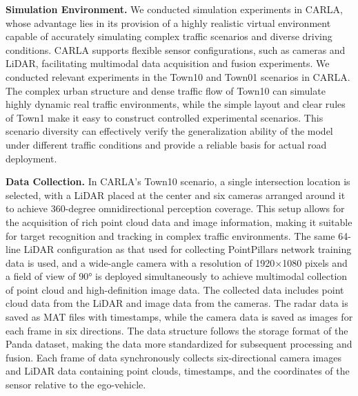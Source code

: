 \documentclass[lettersize,journal]{IEEEtran}
\begin{document}
\textbf{Simulation Environment.}
We conducted simulation experiments in CARLA, whose advantage lies in its provision of a highly realistic virtual environment capable of accurately simulating complex traffic scenarios and diverse driving conditions. 
CARLA supports flexible sensor configurations, such as cameras and LiDAR, facilitating multimodal data acquisition and fusion experiments\cite{Alpher22e}. 
We conducted relevant experiments in the Town10 and Town01 scenarios in CARLA.
The complex urban structure and dense traffic flow of Town10 can simulate highly dynamic real traffic environments, while the simple layout and clear rules of Town1 make it easy to construct controlled experimental scenarios.
This scenario diversity can effectively verify the generalization ability of the model under different traffic conditions and provide a reliable basis for actual road deployment.

\textbf{Data Collection.}
In CARLA's Town10 scenario, a single intersection location is selected, with a LiDAR placed at the center and six cameras arranged around it to achieve 360-degree omnidirectional perception coverage. 
This setup allows for the acquisition of rich point cloud data and image information, making it suitable for target recognition and tracking in complex traffic environments. 
The same 64-line LiDAR configuration as that used for collecting PointPillars network training data is used, and a wide-angle camera with a resolution of 1920\(\times\)1080 pixels and a field of view of 90° is deployed simultaneously to achieve multimodal collection of point cloud and high-definition image data.
The collected data includes point cloud data from the LiDAR and image data from the cameras. 
The radar data is saved as MAT files with timestamps, while the camera data is saved as images for each frame in six directions. 
The data structure follows the storage format of the Panda dataset, making the data more standardized for subsequent processing and fusion\cite{Alpher21c}. 
Each frame of data synchronously collects six-directional camera images and LiDAR data containing point clouds, timestamps, and the coordinates of the sensor relative to the ego-vehicle.
\end{document}
